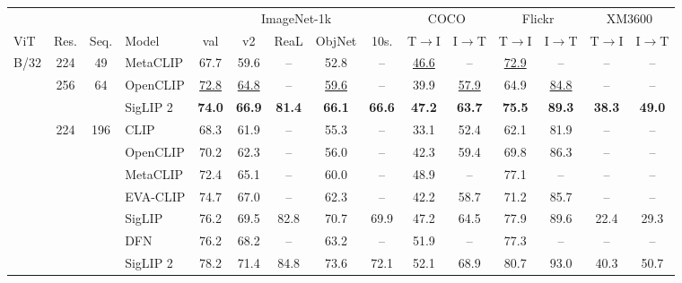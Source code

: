 \setlength{\tabcolsep}{0.52em}
\begin{tabular}{lcclccccccccccc}
\toprule
 &  &  &  & \multicolumn{5}{c}{ImageNet-1k} & \multicolumn{2}{c}{COCO} & \multicolumn{2}{c}{Flickr} & \multicolumn{2}{c}{XM3600} \\ \cmidrule(lr){5-9} \cmidrule(lr){10-11} \cmidrule(lr){12-13} \cmidrule(lr){14-15}
ViT & Res. & Seq. & Model & val & v2 & ReaL & ObjNet & 10s. & T$\rightarrow$I & I$\rightarrow$T & T$\rightarrow$I & I$\rightarrow$T & T$\rightarrow$I & I$\rightarrow$T \\
\midrule
\multirow[c]{3}{*}{B/32} & 224 & 49 & MetaCLIP \cite{xu2024demystifying} & 67.7 & 59.6 & -- & 52.8 & -- & \underline{46.6} & -- & \underline{72.9} & -- & -- & -- \\
\arrayrulecolor{lightgray}\hhline{|~|--------------|} 
 & \multirow[c]{2}{*}{256} & \multirow[c]{2}{*}{64} & OpenCLIP \cite{ilharco2021open} & \underline{72.8} & \underline{64.8} & -- & \underline{59.6} & -- & 39.9 & \underline{57.9} & 64.9 & \underline{84.8} & -- & -- \\
 &  &  & \cellcolor{gray!15}SigLIP 2 & \cellcolor{gray!15}\bf{74.0} & \cellcolor{gray!15}\bf{66.9} & \cellcolor{gray!15}\bf{81.4} & \cellcolor{gray!15}\bf{66.1} & \cellcolor{gray!15}\bf{66.6} & \cellcolor{gray!15}\bf{47.2} & \cellcolor{gray!15}\bf{63.7} & \cellcolor{gray!15}\bf{75.5} & \cellcolor{gray!15}\bf{89.3} & \cellcolor{gray!15}\bf{38.3} & \cellcolor{gray!15}\bf{49.0} \\
\arrayrulecolor{black}\hhline{|---------------|} 
\multirow[c]{13}{*}{B/16} & \multirow[c]{7}{*}{224} & \multirow[c]{7}{*}{196} & CLIP \cite{clip} & 68.3 & 61.9 & -- & 55.3 & -- & 33.1 & 52.4 & 62.1 & 81.9 & -- & -- \\
 &  &  & OpenCLIP \cite{ilharco2021open} & 70.2 & 62.3 & -- & 56.0 & -- & 42.3 & 59.4 & 69.8 & 86.3 & -- & -- \\
 &  &  & MetaCLIP \cite{xu2024demystifying} & 72.4 & 65.1 & -- & 60.0 & -- & 48.9 & -- & 77.1 & -- & -- & -- \\
 &  &  & EVA-CLIP \cite{sun2023eva} & 74.7 & 67.0 & -- & 62.3 & -- & 42.2 & 58.7 & 71.2 & 85.7 & -- & -- \\
 &  &  & SigLIP \cite{siglip} & 76.2 & 69.5 & 82.8 & 70.7 & 69.9 & 47.2 & 64.5 & 77.9 & 89.6 & 22.4 & 29.3 \\
 &  &  & DFN \cite{fang2024dfn} & 76.2 & 68.2 & -- & 63.2 & -- & 51.9 & -- & 77.3 & -- & -- & -- \\
 &  &  & \cellcolor{gray!15}SigLIP 2 & \cellcolor{gray!15}78.2 & \cellcolor{gray!15}71.4 & \cellcolor{gray!15}84.8 & \cellcolor{gray!15}73.6 & \cellcolor{gray!15}72.1 & \cellcolor{gray!15}52.1 & \cellcolor{gray!15}68.9 & \cellcolor{gray!15}80.7 & \cellcolor{gray!15}93.0 & \cellcolor{gray!15}40.3 & \cellcolor{gray!15}50.7 \\

\end{tabular}
